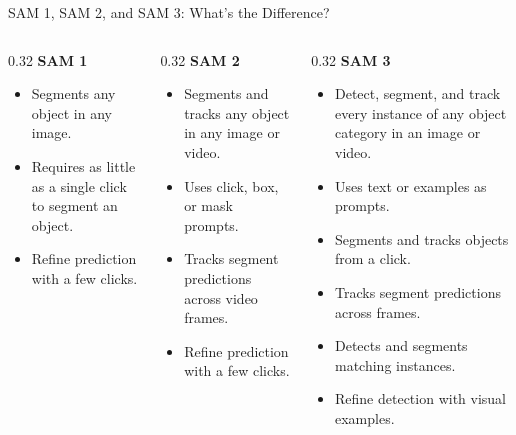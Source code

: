 \begin{frame}{SAM 1, SAM 2, and SAM 3: What's the Difference?}
  \begin{columns}[T,onlytextwidth]
    \begin{column}{0.32\textwidth}
      \textbf{SAM 1}
      \begin{itemize}\footnotesize
        \item Segments any object in any image.
        \item Requires as little as a single click to segment an object.
        \item Refine prediction with a few clicks.
      \end{itemize}
    \end{column}
    \begin{column}{0.32\textwidth}
      \textbf{SAM 2}
      \begin{itemize}\footnotesize
        \item Segments and tracks any object in any image or video.
        \item Uses click, box, or mask prompts.
        \item Tracks segment predictions across video frames.
        \item Refine prediction with a few clicks.
      \end{itemize}
    \end{column}
    \begin{column}{0.32\textwidth}
      \textbf{SAM 3}
      \begin{itemize}\footnotesize
        \item Detect, segment, and track every instance of any object category in an image or video.
        \item Uses text or examples as prompts.
        \item Segments and tracks objects from a click.
        \item Tracks segment predictions across frames.
        \item Detects and segments matching instances.
        \item Refine detection with visual examples.
      \end{itemize}
    \end{column}
  \end{columns}
\end{frame}


